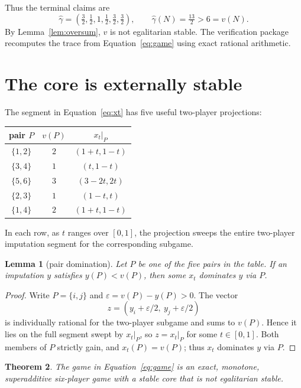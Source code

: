 \documentclass[11pt]{article}
\newtheorem{theorem}{Theorem}[section]
\newtheorem{lemma}[theorem]{Lemma}
\begin{document}
Thus the terminal claims are
\begin{equation}\label{eq:claims}
 \widehat\gamma
 =\left(\tfrac32,\tfrac12,1,\tfrac12,\tfrac32,\tfrac32\right),
 \qquad
 \widehat\gamma(N)=\tfrac{13}{2}>6=v(N).
\end{equation}
By Lemma~\ref{lem:oversum}, $v$ is not egalitarian stable. The verification package
recomputes the trace from Equation~\eqref{eq:game} using exact rational
arithmetic.

\section{The core is externally stable}\label{sec:stability}

The segment in Equation~\eqref{eq:xt} has five useful two-player
projections:
\begin{center}
\begin{tabular}{@{}c c c@{}}
\toprule
pair $P$ & $v(P)$ & $x_t|_P$\\
\midrule
$\{1,2\}$ & $2$ & $(1+t,1-t)$\\
$\{3,4\}$ & $1$ & $(t,1-t)$\\
$\{5,6\}$ & $3$ & $(3-2t,2t)$\\
$\{2,3\}$ & $1$ & $(1-t,t)$\\
$\{1,4\}$ & $2$ & $(1+t,1-t)$\\
\bottomrule
\end{tabular}
\end{center}
In each row, as $t$ ranges over $[0,1]$, the projection sweeps the entire
two-player imputation segment for the corresponding subgame.

\begin{lemma}[pair domination]\label{lem:pair}
Let $P$ be one of the five pairs in the table. If an imputation $y$ satisfies
$y(P)<v(P)$, then some $x_t$ dominates $y$ via $P$.
\end{lemma}

\begin{proof}
Write $P=\{i,j\}$ and
$\varepsilon=v(P)-y(P)>0$. The vector
\[
 z=(y_i+\varepsilon/2,\ y_j+\varepsilon/2)
\]
is individually rational for the two-player subgame and sums to $v(P)$.
Hence it lies on the full segment swept by $x_t|_P$, so
$z=x_t|_P$ for some $t\in[0,1]$. Both members of $P$ strictly gain, and
$x_t(P)=v(P)$; thus $x_t$ dominates $y$ via $P$.
\end{proof}

\begin{theorem}\label{thm:main}
The game in Equation~\eqref{eq:game} is an exact, monotone, superadditive
six-player game with a stable core that is not egalitarian stable.
\end{theorem}
\end{document}
